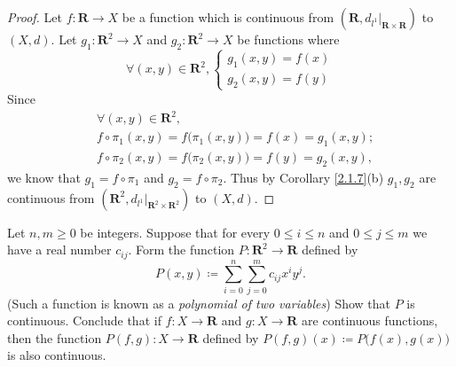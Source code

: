 \begin{proof}
    Let \(f : \mathbf{R} \to X\) be a function which is continuous from \((\mathbf{R}, d_{l^1}|_{\mathbf{R} \times \mathbf{R}})\) to \((X, d)\).
    Let \(g_1 : \mathbf{R}^2 \to X\) and \(g_2 : \mathbf{R}^2 \to X\) be functions where
    \[
        \forall (x, y) \in \mathbf{R}^2, \begin{cases}
            g_1(x, y) = f(x) \\
            g_2(x, y) = f(y)
        \end{cases}
    \]
    Since
    \begin{align*}
         & \forall (x, y) \in \mathbf{R}^2,                                 \\
         & f \circ \pi_1(x, y) = f\big(\pi_1(x, y)\big) = f(x) = g_1(x, y); \\
         & f \circ \pi_2(x, y) = f\big(\pi_2(x, y)\big) = f(y) = g_2(x, y),
    \end{align*}
    we know that \(g_1 = f \circ \pi_1\) and \(g_2 = f \circ \pi_2\).
    Thus by Corollary \ref{2.1.7}(b) \(g_1, g_2\) are continuous from \((\mathbf{R}^2, d_{l^1}|_{\mathbf{R}^2 \times \mathbf{R}^2})\) to \((X, d)\).
\end{proof}

\begin{exercise}\label{ex 2.2.5}
    Let \(n, m \geq 0\) be integers.
    Suppose that for every \(0 \leq i \leq n\) and \(0 \leq j \leq m\) we have a real number \(c_{ij}\).
    Form the function \(P : \mathbf{R}^2 \to \mathbf{R}\) defined by
    \[
        P(x, y) \coloneqq \sum_{i = 0}^n \sum_{j = 0}^m c_{ij} x^i y^j.
    \]
    (Such a function is known as a \emph{polynomial of two variables})
    Show that \(P\) is continuous.
    Conclude that if \(f : X \to \mathbf{R}\) and \(g : X \to \mathbf{R}\) are continuous functions, then the function \(P(f, g) : X \to \mathbf{R}\) defined by \(P(f, g)(x) \coloneqq P\big(f(x), g(x)\big)\) is also continuous.
\end{exercise}

